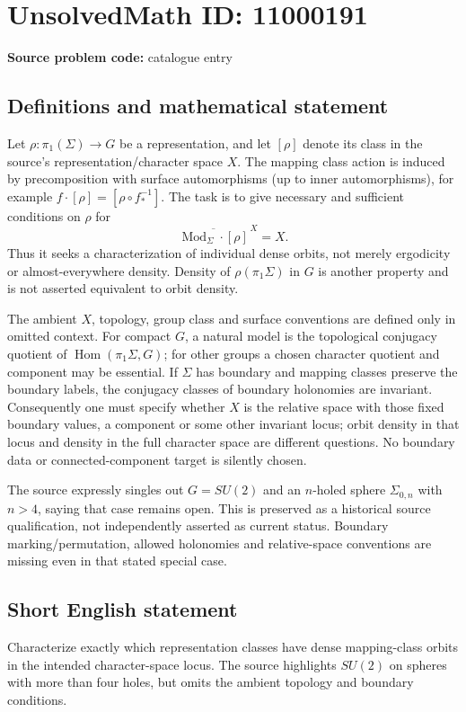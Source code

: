 \documentclass[11pt]{article}
\begin{document}
\section*{UnsolvedMath ID: 11000191}
\textbf{Source problem code:} catalogue entry
\subsection{Definitions and mathematical statement}
Let \(\rho:\pi_1(\Sigma)\to G\) be a representation, and let \([\rho]\) denote its class in the source's representation/character space \(X\). The mapping class action is induced by precomposition with surface automorphisms (up to inner automorphisms), for example \(f\cdot[\rho]=[\rho\circ f_*^{-1}]\). The task is to give necessary and sufficient conditions on \(\rho\) for
\[\overline{\operatorname{Mod}_\Sigma\cdot[\rho]}^{\,X}=X.\]
Thus it seeks a characterization of individual dense orbits, not merely ergodicity or almost-everywhere density. Density of \(\rho(\pi_1\Sigma)\) in \(G\) is another property and is not asserted equivalent to orbit density.

The ambient \(X\), topology, group class and surface conventions are defined only in omitted context. For compact \(G\), a natural model is the topological conjugacy quotient of \(\operatorname{Hom}(\pi_1\Sigma,G)\); for other groups a chosen character quotient and component may be essential. If \(\Sigma\) has boundary and mapping classes preserve the boundary labels, the conjugacy classes of boundary holonomies are invariant. Consequently one must specify whether \(X\) is the relative space with those fixed boundary values, a component or some other invariant locus; orbit density in that locus and density in the full character space are different questions. No boundary data or connected-component target is silently chosen.

The source expressly singles out \(G=SU(2)\) and an \(n\)-holed sphere \(\Sigma_{0,n}\) with \(n>4\), saying that case remains open. This is preserved as a historical source qualification, not independently asserted as current status. Boundary marking/permutation, allowed holonomies and relative-space conventions are missing even in that stated special case.
\subsection{Short English statement}
Characterize exactly which representation classes have dense mapping-class orbits in the intended character-space locus. The source highlights \(SU(2)\) on spheres with more than four holes, but omits the ambient topology and boundary conditions.
\end{document}
